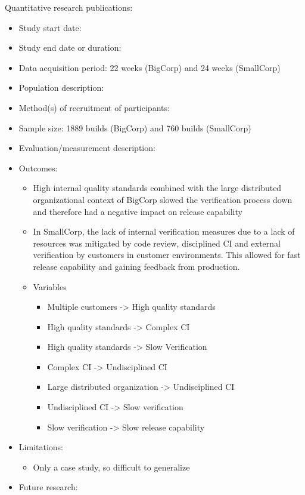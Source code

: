 \documentclass[]{book}
\providecommand{\tightlist}{%
  \setlength{\itemsep}{0pt}\setlength{\parskip}{0pt}}
\begin{document}
Quantitative research publications:

\begin{itemize}
\tightlist
\item
  Study start date:
\item
  Study end date or duration:
\item
  Data acquisition period: 22 weeks (BigCorp) and 24 weeks (SmallCorp)
\item
  Population description:
\item
  Method(s) of recruitment of participants:
\item
  Sample size: 1889 builds (BigCorp) and 760 builds (SmallCorp)
\item
  Evaluation/measurement description:
\item
  Outcomes:

  \begin{itemize}
  \tightlist
  \item
    High internal quality standards combined with the large distributed
    organizational context of BigCorp slowed the verification process
    down and therefore had a negative impact on release capability
  \item
    In SmallCorp, the lack of internal verification measures due to a
    lack of resources was mitigated by code review, disciplined CI and
    external verification by customers in customer environments. This
    allowed for fast release capability and gaining feedback from
    production.
  \item
    Variables

    \begin{itemize}
    \tightlist
    \item
      Multiple customers -\textgreater{} High quality standards
    \item
      High quality standards -\textgreater{} Complex CI
    \item
      High quality standards -\textgreater{} Slow Verification
    \item
      Complex CI -\textgreater{} Undisciplined CI
    \item
      Large distributed organization -\textgreater{} Undisciplined CI
    \item
      Undisciplined CI -\textgreater{} Slow verification
    \item
      Slow verification -\textgreater{} Slow release capability
    \end{itemize}
  \end{itemize}
\item
  Limitations:

  \begin{itemize}
  \tightlist
  \item
    Only a case study, so difficult to generalize
  \end{itemize}
\item
  Future research:
\end{itemize}
\end{document}
